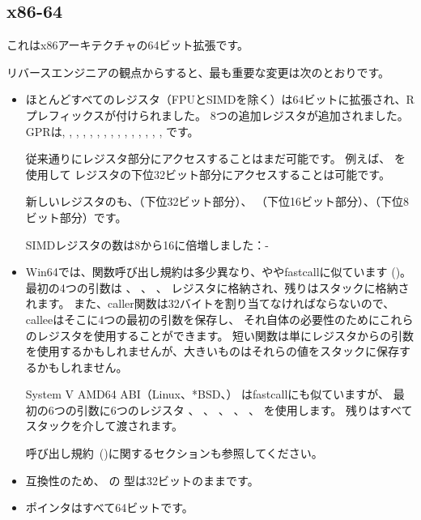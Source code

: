 
\subsection{x86-64}
\label{x86-64}

これはx86アーキテクチャの64ビット拡張です。

リバースエンジニアの観点からすると、最も重要な変更は次のとおりです。

\myindex{\CLanguageElements!\Pointers}
\begin{itemize}

\item

ほとんどすべてのレジスタ（FPUとSIMDを除く）は64ビットに拡張され、Rプレフィックスが付けられました。
8つの追加レジスタが追加されました。
\ac{GPR}は\RAX, \RBX, \RCX, \RDX, 
\RBP, \RSP, \RSI, \RDI, , , , 
, , , , です。

従来通りにレジスタ部分にアクセスすることはまだ可能です。
例えば、 \EAX を使用して \RAX レジスタの下位32ビット部分にアクセスすることは可能です。


新しいレジスタのも、（下位32ビット部分）、
（下位16ビット部分）、（下位8ビット部分）です。


SIMDレジスタの数は8から16に倍増しました：-

\item

Win64では、関数呼び出し規約は多少異なり、ややfastcallに似ています
()。
最初の4つの引数は \RCX 、 \RDX 、 、 レジスタに格納され、残りはスタックに格納されます。
また、\gls{caller}関数は32バイトを割り当てなければならないので、\gls{callee}はそこに4つの最初の引数を保存し、
それ自体の必要性のためにこれらのレジスタを使用することができます。
短い関数は単にレジスタからの引数を使用するかもしれませんが、大きいものはそれらの値をスタックに保存するかもしれません。

System V AMD64 ABI（Linux、*BSD、\MacOSX） \SysVABI はfastcallにも似ていますが、
最初の6つの引数に6つのレジスタ \RDI 、 \RSI 、 \RDX 、 \RCX 、  、 を使用します。
残りはすべてスタックを介して渡されます。

呼び出し規約~()に関するセクションも参照してください。

\item
互換性のため、 \CCpp の \Tint 型は32ビットのままです。

\item
ポインタはすべて64ビットです。

\end{itemize}

